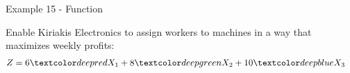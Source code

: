 \begin{frame}{Example 15 - Function}

Enable Kiriakis Electronics to assign workers to machines
in a way that maximizes weekly profits:
\begin{align*}
    Z &= 6\colora{X_1} + 8\colorb{X_2} + 10\colorc{X_3}
\end{align*}


\end{frame}
